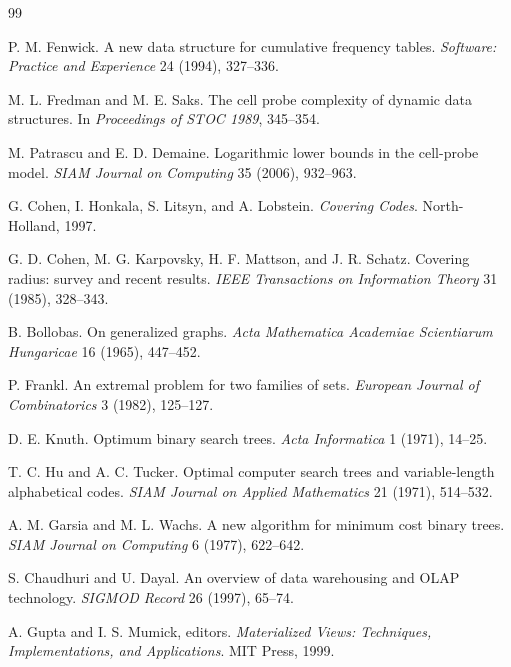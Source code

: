 \documentclass[11pt]{article}
\begin{document}
\begin{thebibliography}{99}

P. M. Fenwick.
A new data structure for cumulative frequency tables.
\emph{Software: Practice and Experience} 24 (1994), 327--336.

M. L. Fredman and M. E. Saks.
The cell probe complexity of dynamic data structures.
In \emph{Proceedings of STOC 1989}, 345--354.

M. Patrascu and E. D. Demaine.
Logarithmic lower bounds in the cell-probe model.
\emph{SIAM Journal on Computing} 35 (2006), 932--963.

G. Cohen, I. Honkala, S. Litsyn, and A. Lobstein.
\emph{Covering Codes}.
North-Holland, 1997.

G. D. Cohen, M. G. Karpovsky, H. F. Mattson, and J. R. Schatz.
Covering radius: survey and recent results.
\emph{IEEE Transactions on Information Theory} 31 (1985), 328--343.

B. Bollobas.
On generalized graphs.
\emph{Acta Mathematica Academiae Scientiarum Hungaricae} 16 (1965), 447--452.

P. Frankl.
An extremal problem for two families of sets.
\emph{European Journal of Combinatorics} 3 (1982), 125--127.

D. E. Knuth.
Optimum binary search trees.
\emph{Acta Informatica} 1 (1971), 14--25.

T. C. Hu and A. C. Tucker.
Optimal computer search trees and variable-length alphabetical codes.
\emph{SIAM Journal on Applied Mathematics} 21 (1971), 514--532.

A. M. Garsia and M. L. Wachs.
A new algorithm for minimum cost binary trees.
\emph{SIAM Journal on Computing} 6 (1977), 622--642.

S. Chaudhuri and U. Dayal.
An overview of data warehousing and OLAP technology.
\emph{SIGMOD Record} 26 (1997), 65--74.

A. Gupta and I. S. Mumick, editors.
\emph{Materialized Views: Techniques, Implementations, and Applications}.
MIT Press, 1999.

\end{thebibliography}
\end{document}
